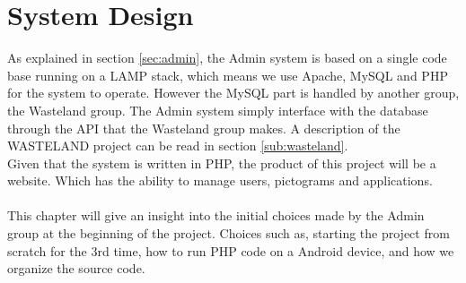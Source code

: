 \chapter{System Design}
\label{chap:systemDesign}
As explained in section \vref{sec:admin}, the Admin system is based on a single code base running on a LAMP stack, which means we use Apache, MySQL and PHP for the system to operate. However the MySQL part is handled by another group, the Wasteland group. The Admin system simply interface with the database through the API that the Wasteland group makes. A description of the WASTELAND project can be read in section \vref{sub:wasteland}.\\
Given that the system is written in PHP, the product of this project will be a website. Which has the ability to manage users, pictograms and applications.\\
\\
This chapter will give an insight into the initial choices made by the Admin group at the beginning of the project. Choices such as, starting the project from scratch for the 3rd time, how to run PHP code on a Android device, and how we organize the source code.


